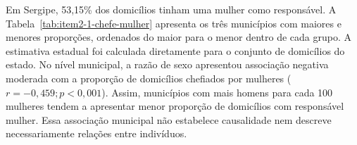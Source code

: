 Em Sergipe, 53,15\% dos domicílios tinham uma mulher como responsável. A Tabela~\ref{tab:item2-1-chefe-mulher} apresenta os três municípios com maiores e menores proporções, ordenados do maior para o menor dentro de cada grupo. A estimativa estadual foi calculada diretamente para o conjunto de domicílios do estado. No nível municipal, a razão de sexo apresentou associação negativa moderada com a proporção de domicílios chefiados por mulheres ($r = -0{,}459; p < 0{,}001$). Assim, municípios com mais homens para cada 100 mulheres tendem a apresentar menor proporção de domicílios com responsável mulher. Essa associação municipal não estabelece causalidade nem descreve necessariamente relações entre indivíduos.
